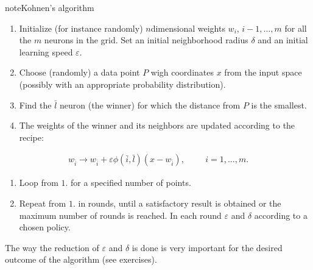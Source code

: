 \documentclass[letterpaper,10pt,english]{jupyterBook}
\begin{document}
\begin{sphinxadmonition}{note}{Kohnen’s algorithm}
\begin{enumerate}
%
\item {} 
\sphinxAtStartPar
Initialize (for instance randomly) \(n\)\sphinxhyphen{}dimensional weights \(w_i\), \(i-1,\dots,m\) for all the \(m\) neurons in the grid. Set an initial neighborhood radius \( \delta \) and an initial learning speed \( \varepsilon \).

\item {} 
\sphinxAtStartPar
Choose (randomly) a data point \(P\) wigh coordinates \(x\) from the input space (possibly with an appropriate probability distribution).

\item {} 
\sphinxAtStartPar
Find the \( \bar {l} \) neuron (the winner) for which the distance from \(P\) is the smallest.

\item {} 
\sphinxAtStartPar
The weights of the winner and its neighbors are updated according to the  recipe:

\end{enumerate}
\begin{equation*}
\begin{split}w_{\bar{i}} \to w_{\bar{i}} + \varepsilon \phi(\bar{i}, \bar{l})(x - w_{\bar{i}}), \hspace{1cm} i=1, . . . , m. 
\end{split}
\end{equation*}\begin{enumerate}
%
\item {} 
\sphinxAtStartPar
Loop from \(1.\) for a specified number of points.

\item {} 
\sphinxAtStartPar
Repeat from \(1.\) in rounds, until a satisfactory result is obtained or the maximum number of rounds is reached. In each round   \( \varepsilon \) and \( \delta \) according to a chosen policy.

\end{enumerate}
\end{sphinxadmonition}

\sphinxAtStartPar
The way the reduction of \( \varepsilon \) and \( \delta \) is done is very important for the desired outcome of the algorithm (see exercises).
\end{document}
